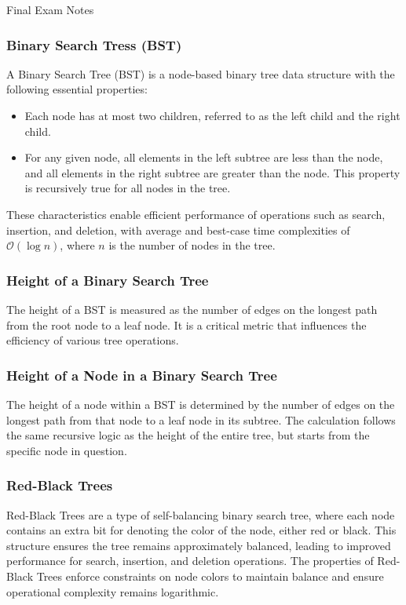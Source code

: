 \begin{examnotes}{Final Exam Notes}
    \subsubsection*{Binary Search Tress (BST)}

    A Binary Search Tree (BST) is a node-based binary tree data structure with the following essential properties:
    
    \begin{itemize}
        \item Each node has at most two children, referred to as the left child and the right child.
        \item For any given node, all elements in the left subtree are less than the node, and all elements in the right subtree are greater than the node. This property is recursively true for all 
        nodes in the tree.
    \end{itemize}
    
    These characteristics enable efficient performance of operations such as search, insertion, and deletion, with average and best-case time complexities of $\mathcal{O}(\log n)$, where $n$ is the 
    number of nodes in the tree.
    
    \subsubsection*{Height of a Binary Search Tree}
    
    The height of a BST is measured as the number of edges on the longest path from the root node to a leaf node. It is a critical metric that influences the efficiency of various tree operations.

    \subsubsection*{Height of a Node in a Binary Search Tree}

    The height of a node within a BST is determined by the number of edges on the longest path from that node to a leaf node in its subtree. The calculation follows the same recursive logic as the 
    height of the entire tree, but starts from the specific node in question.

    \subsubsection*{Red-Black Trees}

    Red-Black Trees are a type of self-balancing binary search tree, where each node contains an extra bit for denoting the color of the node, either red or black. This structure ensures the tree 
    remains approximately balanced, leading to improved performance for search, insertion, and deletion operations. The properties of Red-Black Trees enforce constraints on node colors to maintain 
    balance and ensure operational complexity remains logarithmic.


\end{examnotes}
